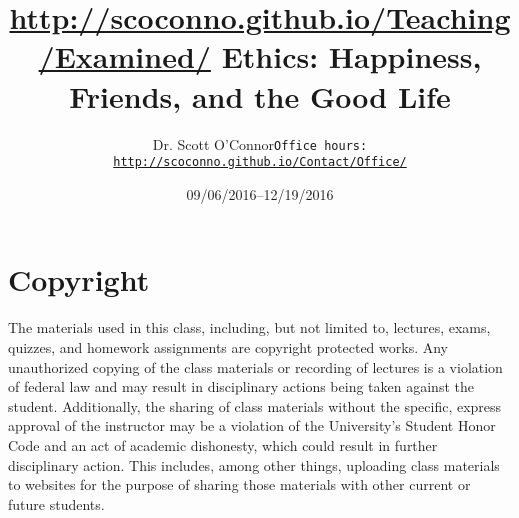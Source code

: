 \documentclass[article,oneside]{memoir}
\def\myauthor{Author}
\def\mytitle{Title}
\def\mycopyright{\myauthor}
\def\myweb{\href{http://scoconno.github.io/Teaching/Examined/}{http://scoconno.github.io/Teaching/Examined/}}
\def\myauthor{Dr. Scott O'Connor}
\def\mytitle{{\normalsize \myweb \newline} \HUGE Ethics: Happiness, Friends, and the Good Life}
\begin{document}
\setsansfont[Mapping=tex-text]{Myriad Pro} 
\setmonofont[Mapping=tex-text,Scale=0.8]{Georgia} 

\def\ind{\hangindent=1 true cm\hangafter=1 \noindent}
\def\labelitemi{$\cdot$}


\title{\LARGE \mytitle}     
\author{\Large\myauthor \newline \footnotesize\texttt{\noindent Office hours: \href{http://scoconno.github.io/Contact/Office/}{http://scoconno.github.io/Contact/Office/}}}
\date{09/06/2016--12/19/2016}


\maketitle




%
%

\section{Copyright}
The materials used in this class, including, but not limited to, lectures, exams, quizzes, and homework assignments are copyright protected works.  Any unauthorized copying of the class materials or recording of lectures is a violation of federal law and may result in disciplinary actions being taken against the student.  Additionally, the sharing of class materials without the specific, express approval of the instructor may be a violation of the University's Student Honor Code and an act of academic dishonesty, which could result in further disciplinary action.  This includes, among other things, uploading class materials to websites for the purpose of sharing those materials with other current or future students. 
\end{document}

